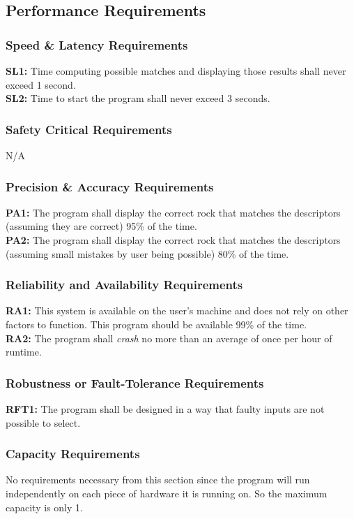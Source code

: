 \documentclass[titlepage]{article}
\begin{document}
\subsection{Performance Requirements}
\subsubsection{Speed \& Latency Requirements}
\textbf{SL1:} Time computing possible matches and displaying those results shall never exceed 1 second.\\

\noindent\textbf{SL2:} Time to start the program shall never exceed 3 seconds.
\subsubsection{Safety Critical Requirements}
N/A
\subsubsection{Precision \& Accuracy Requirements}
\textbf{PA1:} The program shall display the correct rock that matches the descriptors (assuming they are correct) 95\% of the time.\\

\noindent\textbf{PA2:} The program shall display the correct rock that matches the descriptors (assuming small mistakes by user being possible) 80\% of the time.
\subsubsection{Reliability and Availability Requirements}
\textbf{RA1:} This system is available on the user's machine and does not rely on other factors to function. This program should be available 99\% of the time.\\

\noindent\textbf{RA2:} The program shall \textit{crash} no more than an average of once per hour of runtime.
\subsubsection{Robustness or Fault-Tolerance Requirements}
\textbf{RFT1:} The program shall be designed in a way that faulty inputs are not possible to select.
\subsubsection{Capacity Requirements}
No requirements necessary from this section since the program will run independently on each piece of hardware it is running on. So the maximum capacity is only 1.
\end{document}
